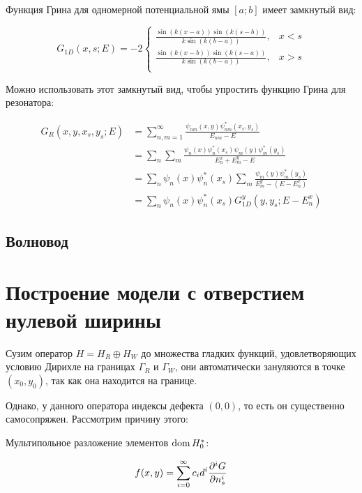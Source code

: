 
Функция Грина для одномерной потенциальной ямы $[a; b]$ имеет замкнутый вид:

$$G_{1D}(x, s; E) = - 2 \begin{cases}
\frac{\sin(k(x - a)) \sin(k(s - b))}{k \sin(k(b - a))}, & x < s \\
\frac{\sin(k(x - b)) \sin(k(s - a))}{k \sin(k(b - a))}, & x > s \\
\end{cases}$$

Можно использовать этот замкнутый вид, чтобы упростить функцию Грина для резонатора:

\begin{align*}
G_R(x, y, x_s, y_s; E)
&= \sum\limits_{n, m = 1}^\infty \frac{\psi_{nm}(x, y) \psi^*_{nm}(x_s, y_s)}{E_{nm} - E} \\
&= \sum\limits_n \sum\limits_m \frac{\psi_n(x) \psi_n^*(x_s) \psi_m(y) \psi_m^*(y_s)}{E^x_n + E^y_m - E} \\
&= \sum\limits_n \psi_n(x) \psi_n^*(x_s) \sum\limits_m \frac{\psi_m(y) \psi_m^*(y_s)}{E^y_m - (E - E^x_n)} \\
&= \sum\limits_n \psi_n(x) \psi^*_n(x_s) G^y_{1D}(y, y_s; E - E^x_n)
\end{align*}

\subsection{Волновод}


\section{Построение модели с отверстием нулевой ширины}
Сузим оператор $H = H_R \oplus H_W$ до множества гладких функций, удовлетворяющих условию Дирихле на границах $\Gamma_R$ и $\Gamma_W$, они автоматически зануляются в точке $(x_0, y_0)$, так как она находится на границе.

Однако, у данного оператора индексы дефекта $(0, 0)$, то есть он существенно самосопряжен. Рассмотрим причину этого:


Мультипольное разложение элементов $\operatorname{dom} H_0^*$:

\[
f(x, y) = \sum\limits_{i = 0}^\infty c_i d^i \pdv[i]{G}{n_s} (x, y, x_0, y_0; E_0)
\]

